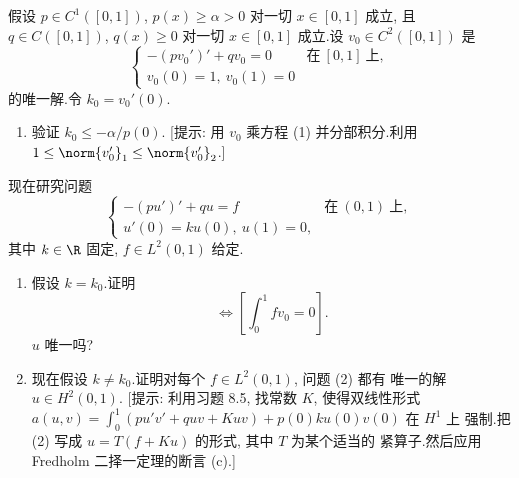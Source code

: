 \begin{exercise}
\label{exer:8.21}
假设 $p\in C^1([0,1])$, $p(x)\ge\alpha>0$ 对一切 $x\in[0,1]$ 成立, 且
$q\in C([0,1])$, $q(x)\ge0$ 对一切 $x\in[0,1]$ 成立.设 $v_0\in C^2([0,1])$
是
\begin{equation}
\begin{cases}
-(pv_0')'+qv_0=0 & \text{在}\ [0,1]\ \text{上},\\
v_0(0)=1,\ v_0(1)=0
\end{cases}
\tag{1}
\end{equation}
的唯一解.令 $k_0=v_0'(0)$.
\begin{enumerate}[label=\arabic*., leftmargin=2.2em, itemsep=0.3em]
	\item 验证 $k_0\le-\alpha/p(0)$.
	      [提示: 用 $v_0$ 乘方程 (1) 并分部积分.利用
	      $1\le\norm{v_0'}_1\le\norm{v_0'}_2$.]
\end{enumerate}
现在研究问题
\begin{equation}
\begin{cases}
-(pu')'+qu=f & \text{在}\ (0,1)\ \text{上},\\
u'(0)=ku(0),\ u(1)=0,
\end{cases}
\tag{2}
\end{equation}
其中 $k\in\R$ 固定, $f\in L^2(0,1)$ 给定.
\begin{enumerate}[label=\arabic*., leftmargin=2.2em, itemsep=0.3em, start=2]
	\item 假设 $k=k_0$.证明
	      \begin{equation*}
	      [(2)\ \text{有解}\ u\in H^2(0,1)]\iff\left[\int_0^1fv_0=0\right].
	      \end{equation*}
	      $u$ 唯一吗?
	\item 现在假设 $k\ne k_0$.证明对每个 $f\in L^2(0,1)$, 问题 (2) 都有
	      唯一的解 $u\in H^2(0,1)$.
	      [提示: 利用习题 8.5, 找常数 $K$, 使得双线性形式
	      $a(u,v)=\int_0^1(pu'v'+quv+Kuv)+p(0)ku(0)v(0)$ 在 $H^1$ 上
	      强制.把 (2) 写成 $u=T(f+Ku)$ 的形式, 其中 $T$ 为某个适当的
	      紧算子.然后应用 Fredholm 二择一定理的断言 (c).]
\end{enumerate}
\end{exercise}

